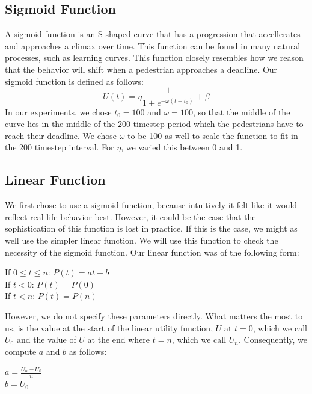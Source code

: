 \documentclass[11pt]{book}
\begin{document}
\subsection{Sigmoid Function}
A sigmoid function is an S-shaped curve that has a progression that accellerates and approaches a climax over time. This function can be found in many natural processes, such as learning curves. This function closely resembles how we reason that the behavior will shift when a pedestrian approaches a deadline.
Our sigmoid function is defined as follows:
\begin{equation}
U(t) = \eta \frac{1}{1+e^{-\omega(t-t_0)}} + \beta
\end{equation}
In our experiments, we chose $t_0=100$ and $\omega=100$, so that the middle of the curve lies in the middle of the 200-timestep period which the pedestrians have to reach their deadline. We chose $\omega$ to be 100 as well to scale the function to fit in the 200 timestep interval. For $\eta$, we varied this between 0 and 1.


\subsection{Linear Function}
We first chose to use a sigmoid function, because intuitively it felt like it would reflect real-life behavior best. However, it could be the case that the sophistication of this function is lost in practice. If this is the case, we might as well use the simpler linear function. We will use this function to check the necessity of the sigmoid function. Our linear function was of the following form:
\begin{center}
If $0 \leq t \leq n$: $P(t) = at + b$\\
If $t<0$: $P(t) = P(0)$\\
If $t<n$: $P(t) = P(n)$
\end{center}
However, we do not specify these parameters directly. What matters the most to us, is the value at the start of the linear utility function, $U$ at $t=0$, which we call $U_0$ and the value of $U$ at the end where $t=n$, which we call $U_n$. Consequently, we compute $a$ and $b$ as follows:
\begin{center}
$a = \frac{U_n - U_0}{n}$\\
$b = U_0$
\end{center}
\end{document}
